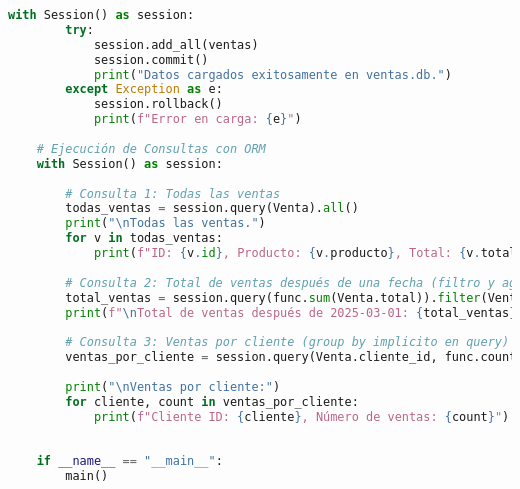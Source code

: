 \documentclass[12pt,a4paper]{article}
\begin{document}
\begin{lstlisting}[language=Python, caption={ETL con SQLAlchemy}]
    with Session() as session:
        try:
            session.add_all(ventas)
            session.commit()
            print("Datos cargados exitosamente en ventas.db.")
        except Exception as e:
            session.rollback()
            print(f"Error en carga: {e}")
            
    # Ejecución de Consultas con ORM
    with Session() as session:
    
        # Consulta 1: Todas las ventas
        todas_ventas = session.query(Venta).all()
        print("\nTodas las ventas.")
        for v in todas_ventas:
            print(f"ID: {v.id}, Producto: {v.producto}, Total: {v.total}")
            
        # Consulta 2: Total de ventas después de una fecha (filtro y agregación)
        total_ventas = session.query(func.sum(Venta.total)).filter(Venta.fecha > pd.to_datetime("2025-03-01")).scalar()
        print(f"\nTotal de ventas después de 2025-03-01: {total_ventas}")
        
        # Consulta 3: Ventas por cliente (group by implicito en query)
        ventas_por_cliente = session.query(Venta.cliente_id, func.count(Venta.id)).group_by(Venta.cliente_id).all()
        
        print("\nVentas por cliente:")
        for cliente, count in ventas_por_cliente:
            print(f"Cliente ID: {cliente}, Número de ventas: {count}")
            
            
    if __name__ == "__main__":
        main()
\end{lstlisting}
\end{document}
